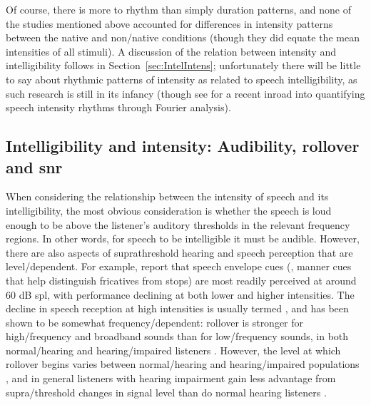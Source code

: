 Of course, there is more to rhythm than simply duration patterns, and none of the studies mentioned above %
accounted for differences in intensity patterns between the native and non\-/native conditions (though they did equate the mean intensities of all stimuli).  A discussion of the relation between intensity and intelligibility follows in Section~\ref{sec:IntelIntens}; unfortunately there will be little to say about rhythmic patterns of intensity as related to speech intelligibility, as such research is still in its infancy (though see \citealt{TilsenJohnson2008} for a recent inroad into quantifying speech intensity rhythms through Fourier analysis).

\subsection[Intelligibility and intensity]{Intelligibility and intensity: Audibility, rollover and \ac{snr}\label{sec:IntelIntens}}
When considering the relationship between the intensity of speech and its intelligibility, the most obvious consideration is whether the speech is loud enough to be above the listener’s auditory thresholds in the relevant frequency regions.  In other words, for speech to be intelligible it must be audible.  However, there are also aspects of suprathreshold hearing and speech perception that are level\-/dependent.  For example, \citet{DubnoEtAl2012} report that speech envelope cues (\eg, manner cues that help distinguish fricatives from stops) are most readily perceived at around 60 {dB} \ac{spl}, with performance declining at both lower and higher intensities.  The decline in speech reception at high intensities is usually termed , and has been shown to be somewhat frequency\-/dependent: rollover is stronger for high\-/frequency and broadband sounds than for low\-/frequency sounds, in both normal\-/hearing and hearing\-/impaired listeners \citep{SummersCord2007}.  However, the level at which rollover begins varies between normal\-/hearing and hearing\-/impaired populations \citep{SummersCord2007}, and in general listeners with hearing impairment gain less advantage from supra\-/threshold changes in signal level than do normal hearing listeners \citep{SummersMolis2004}.

